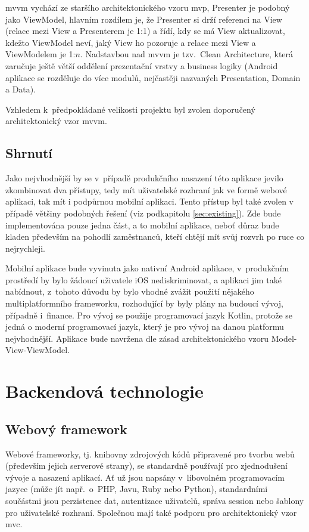\documentclass[twoside]{ctuthesis}
\begin{document}
\acrshort{mvvm} vychází ze staršího architektonického vzoru \acrshort{mvp}, Presenter je podobný jako ViewModel, hlavním rozdílem je, že Presenter si drží referenci na View (relace mezi View a Presenterem je 1:1) a řídí, kdy se má View aktualizovat, kdežto ViewModel neví, jaký View ho pozoruje a relace mezi View a ViewModelem je 1:$n$. \cite{vogel2017android} Nadstavbou nad \acrshort{mvvm} je tzv.~Clean Architecture, která zaručuje ještě větší oddělení prezentační vrstvy a business logiky (Android aplikace se rozděluje do více modulů, nejčastěji nazvaných Presentation, Domain a Data). \cite{jain2019kotlin}

Vzhledem k~předpokládané velikosti projektu byl zvolen doporučený architektonický vzor \acrshort{mvvm}.

\subsection{Shrnutí}

Jako nejvhodnější by se v~případě produkčního nasazení této aplikace jevilo zkombinovat dva přístupy, tedy mít uživatelské rozhraní jak ve formě webové aplikaci, tak mít i podpůrnou mobilní aplikaci. Tento přístup byl také zvolen v případě většiny podobných řešení (viz podkapitolu \ref{sec:existing}). Zde bude implementována pouze jedna část, a to mobilní aplikace, neboť důraz bude kladen především na pohodlí zaměstnanců, kteří chtějí mít svůj rozvrh po ruce co nejrychleji.

Mobilní aplikace bude vyvinuta jako nativní Android aplikace, v~produkčním prostředí by bylo žádoucí uživatele iOS nediskriminovat, a aplikaci jim také nabídnout, z~tohoto důvodu by bylo vhodné zvážit použití nějakého multiplatformního frameworku, rozhodující by byly plány na budoucí vývoj, případně i~finance. Pro vývoj se použije programovací jazyk Kotlin, protože se jedná o moderní programovací jazyk, který je pro vývoj na danou platformu nejvhodnější. Aplikace bude navržena dle zásad architektonického vzoru Model-View-ViewModel.


\section{Backendová technologie}

\subsection{Webový framework}

Webové frameworky, tj. knihovny zdrojových kódů připravené pro tvorbu webů (především jejich serverové strany), se standardně používají pro zjednodušení vývoje a nasazení aplikací. Ať už jsou napsány v~libovolném programovacím jazyce (může jít např.~o~PHP, Javu, Ruby nebo Python), standardními součástmi jsou perzistence dat, autentizace uživatelů, správa session nebo šablony pro uživatelské rozhraní. Společnou mají také podporu pro architektonický vzor \acrshort{mvc}. \cite{docforge2014web}
\end{document}
